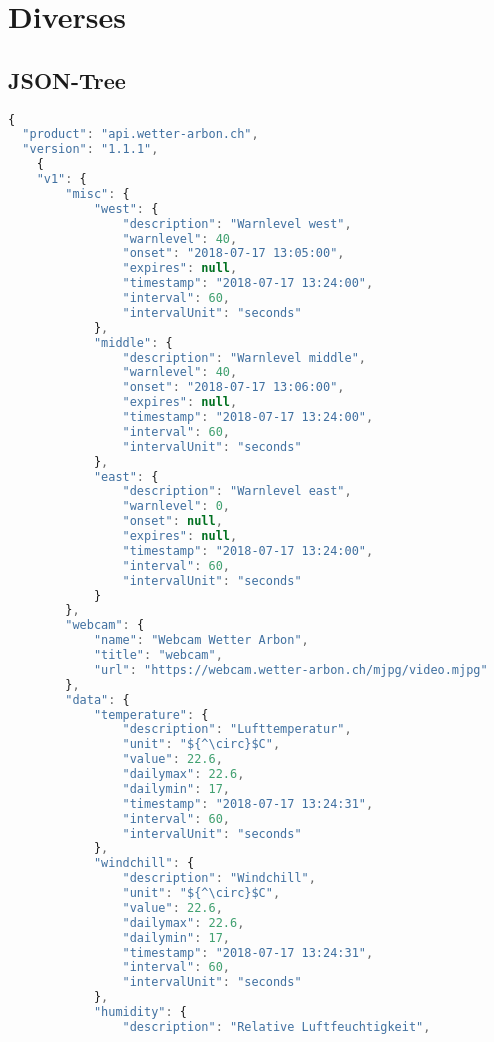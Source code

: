 \section{Diverses}

\subsection{JSON-Tree}

\begin{lstlisting}[label=lst:JsonTree,caption=Json Struktur, language=JavaScript, style=htmlcssjs, mathescape]
{
  "product": "api.wetter-arbon.ch",
  "version": "1.1.1",
	{
    "v1": {
        "misc": {
            "west": {
                "description": "Warnlevel west",
                "warnlevel": 40,
                "onset": "2018-07-17 13:05:00",
                "expires": null,
                "timestamp": "2018-07-17 13:24:00",
                "interval": 60,
                "intervalUnit": "seconds"
            },
            "middle": {
                "description": "Warnlevel middle",
                "warnlevel": 40,
                "onset": "2018-07-17 13:06:00",
                "expires": null,
                "timestamp": "2018-07-17 13:24:00",
                "interval": 60,
                "intervalUnit": "seconds"
            },
            "east": {
                "description": "Warnlevel east",
                "warnlevel": 0,
                "onset": null,
                "expires": null,
                "timestamp": "2018-07-17 13:24:00",
                "interval": 60,
                "intervalUnit": "seconds"
            }
        },
        "webcam": {
            "name": "Webcam Wetter Arbon",
            "title": "webcam",
            "url": "https://webcam.wetter-arbon.ch/mjpg/video.mjpg"
        },
        "data": {
            "temperature": {
                "description": "Lufttemperatur",
                "unit": "${^\circ}$C",
                "value": 22.6,
                "dailymax": 22.6,
                "dailymin": 17,
                "timestamp": "2018-07-17 13:24:31",
                "interval": 60,
                "intervalUnit": "seconds"
            },
            "windchill": {
                "description": "Windchill",
                "unit": "${^\circ}$C",
                "value": 22.6,
                "dailymax": 22.6,
                "dailymin": 17,
                "timestamp": "2018-07-17 13:24:31",
                "interval": 60,
                "intervalUnit": "seconds"
            },
            "humidity": {
                "description": "Relative Luftfeuchtigkeit",

\end{lstlisting}
